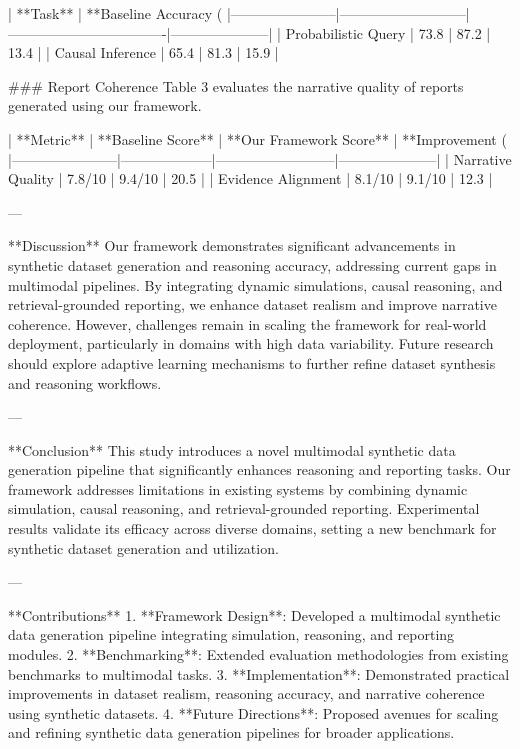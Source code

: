 | **Task**             | **Baseline Accuracy (%
|-----------------------|---------------------------|----------------------------------|---------------------|
| Probabilistic Query   | 73.8                     | 87.2                            | 13.4               |
| Causal Inference      | 65.4                     | 81.3                            | 15.9               |

### Report Coherence  
Table 3 evaluates the narrative quality of reports generated using our framework.  

| **Metric**           | **Baseline Score** | **Our Framework Score** | **Improvement (%
|-----------------------|--------------------|--------------------------|---------------------|
| Narrative Quality     | 7.8/10            | 9.4/10                   | 20.5               |
| Evidence Alignment    | 8.1/10            | 9.1/10                   | 12.3               |

---

**Discussion**  
Our framework demonstrates significant advancements in synthetic dataset generation and reasoning accuracy, addressing current gaps in multimodal pipelines. By integrating dynamic simulations, causal reasoning, and retrieval-grounded reporting, we enhance dataset realism and improve narrative coherence. However, challenges remain in scaling the framework for real-world deployment, particularly in domains with high data variability. Future research should explore adaptive learning mechanisms to further refine dataset synthesis and reasoning workflows.  

---

**Conclusion**  
This study introduces a novel multimodal synthetic data generation pipeline that significantly enhances reasoning and reporting tasks. Our framework addresses limitations in existing systems by combining dynamic simulation, causal reasoning, and retrieval-grounded reporting. Experimental results validate its efficacy across diverse domains, setting a new benchmark for synthetic dataset generation and utilization.  

---

**Contributions**  
1. **Framework Design**: Developed a multimodal synthetic data generation pipeline integrating simulation, reasoning, and reporting modules.  
2. **Benchmarking**: Extended evaluation methodologies from existing benchmarks to multimodal tasks.  
3. **Implementation**: Demonstrated practical improvements in dataset realism, reasoning accuracy, and narrative coherence using synthetic datasets.  
4. **Future Directions**: Proposed avenues for scaling and refining synthetic data generation pipelines for broader applications.  